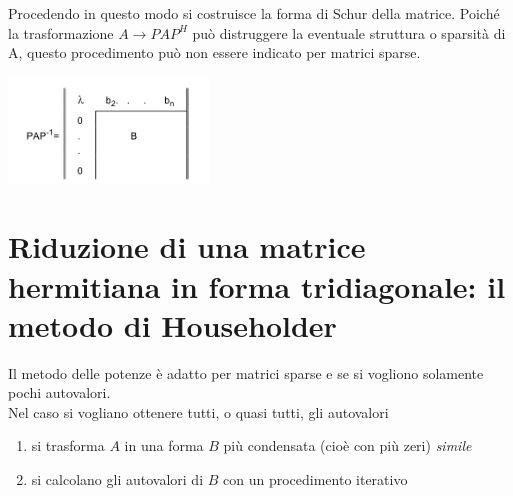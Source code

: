 Procedendo in questo modo si costruisce la forma di Schur della matrice.
Poich\'e la trasformazione $A \rightarrow P AP^H$ pu\`o distruggere la
eventuale struttura o sparsit\`a di A, questo procedimento pu\`o non
essere indicato per matrici sparse.
\begin{center}
\includegraphics[width=0.4\textwidth]{imgs/img06.png}
\end{center}

\section{Riduzione di una matrice hermitiana in forma
tridiagonale: il metodo di Householder}
Il metodo delle potenze \`e adatto per matrici sparse e se
si vogliono solamente pochi autovalori. \\
Nel caso si vogliano ottenere tutti, o quasi tutti, gli autovalori
\begin{enumerate}
\item si trasforma $A$ in una forma $B$ più condensata (cioè con più
  zeri) \emph{simile}
\item si calcolano gli autovalori di $B$ con un procedimento iterativo
\end{enumerate}


